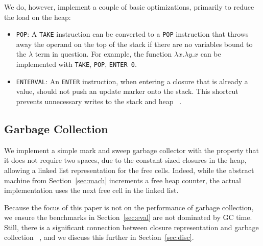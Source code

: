 We do, however, implement a couple of basic optimizations, primarily to reduce
the load on the heap:

\begin{itemize}
\item \texttt{POP}: A \texttt{TAKE} instruction can be converted to a \texttt{POP}
instruction that throws away the operand on the top of the stack if there are no
variables bound to the $\lambda$ term in question. For example, the function
$\lambda x.\lambda y.x$ can be implemented with \texttt{TAKE}, \texttt{POP},
\texttt{ENTER 0}.  
\item \texttt{ENTERVAL}: An \texttt{ENTER} instruction, when entering a
closure that is already a value, should not push an update marker onto the
stack. This shortcut prevents unnecessary writes to the stack and heap
~\cite{jonesstg,lkm,sestoft}.  
\end{itemize}

\subsection{Garbage Collection}

We implement a simple mark and sweep garbage collector with the property
that it does not require two spaces, due to the constant sized closures in the
heap, allowing a linked list representation for the free cells.  Indeed,
while the abstract machine from Section~\ref{sec:mach} increments a free heap
counter, the actual implementation uses the next free cell in the linked list.

Because the focus of this paper is not on the performance of garbage collection,
we ensure the benchmarks in Section~\ref{sec:eval} are not dominated by GC time.
Still, there is a significant connection between closure representation and
garbage collection ~\cite{appel1988optimizing}, and we discuss this further in
Section~\ref{sec:disc}. 

